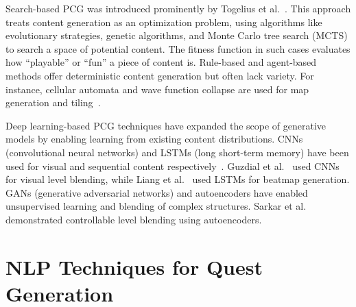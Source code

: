 Search-based PCG was introduced prominently by Togelius et al.~\cite{togelius2011search}. This approach
treats content generation as an optimization problem, using algorithms like evolutionary
strategies, genetic algorithms, and Monte Carlo tree search (MCTS) to search a space of
potential content. The fitness function in such cases evaluates how “playable” or “fun”
a piece of content is. Rule-based and agent-based methods offer deterministic content
generation but often lack variety. For instance, cellular automata and wave function
collapse are used for map generation and tiling~\cite{shaker2016procedural}.

Deep learning-based PCG techniques have expanded the scope of generative models
by enabling learning from existing content distributions. CNNs (convolutional neural
networks) and LSTMs (long short-term memory) have been used for visual and sequential
content respectively~\cite{liu2021deep}. Guzdial et al.~\cite{guzdial2017visual} used CNNs for visual level blending, while
Liang et al.~\cite{liang2019procedural} used LSTMs for beatmap generation. GANs (generative adversarial
networks) and autoencoders have enabled unsupervised learning and blending of complex
structures. Sarkar et al.~\cite{sarkar2020controllable} demonstrated controllable level blending using autoencoders.

\section{NLP Techniques for Quest Generation}

